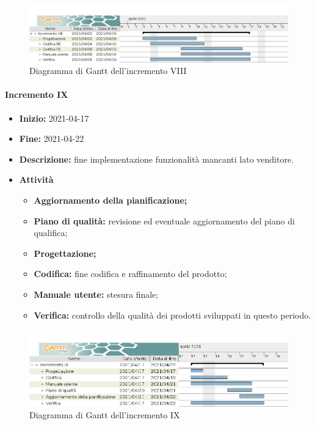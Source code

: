 \begin{figure}[H]
    \centering
    \includegraphics[width=1\linewidth]{res/images/pianificazione/incremento_8.png}
    \caption{Diagramma di Gantt dell'incremento VIII}
    \label{fig:_Gantt incremento VIII}
\end{figure}

\paragraph[Incremento IX]{Incremento IX}
\begin{itemize}
    \item [] \textbf{Inizio:} 2021-04-17
    \item [] \textbf{Fine:} 2021-04-22
    \item [] \textbf{Descrizione:} fine implementazione funzionalità mancanti lato venditore.
    \item [] \textbf{Attività}
          \begin{itemize}
              \item \textbf{Aggiornamento della pianificazione;}
              \item \textbf{Piano di qualità:} revisione ed eventuale aggiornamento del piano di qualifica;
              \item \textbf{Progettazione;}
              \item \textbf{Codifica:} fine codifica e raffinamento del prodotto;
              \item \textbf{Manuale utente:} stesura finale;
              \item \textbf{Verifica:} controllo della qualità dei prodotti sviluppati in questo periodo.
          \end{itemize}
\end{itemize}

\begin{figure}[H]
    \centering
    \includegraphics[width=1\linewidth]{res/images/pianificazione/incremento_9.png}
    \caption{Diagramma di Gantt dell'incremento IX}
    \label{fig:_Gantt incremento IX}
\end{figure}

